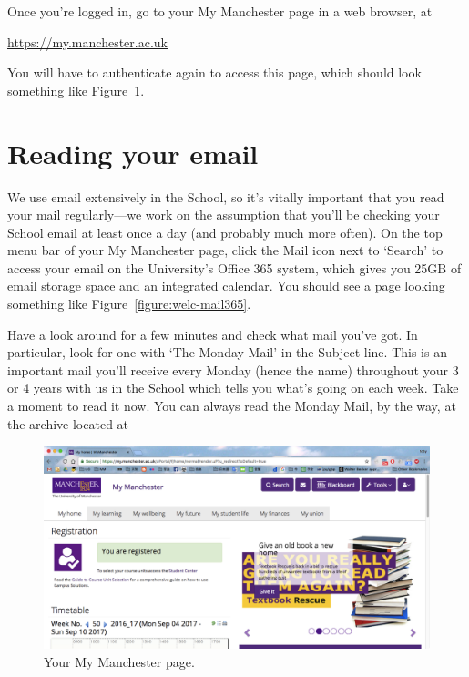 Once you're logged in, go to your My Manchester page in a web browser, at

\url{https://my.manchester.ac.uk}

You will have to authenticate again to access this page, which should look something like Figure~\ref{figure:welc-mymanchester}.


\section{Reading your email}

We use email extensively in the School, so it's vitally important that
you read your mail regularly---we work on the assumption that you'll
be checking your School email at least once a day (and probably much
more often). On the top menu bar of your My Manchester page, click the Mail icon next to `Search'
to access your email on the University's Office 365 system, which gives you 25GB of
email storage space and an integrated calendar. You should see a page
looking something like Figure~\ref{figure:welc-mail365}.

\begin{firstonly}
Have a look around for a few minutes and check what mail you've
got. In particular, look for one with `The Monday Mail' in the
Subject line. This is an important mail you'll receive every Monday
(hence the name) throughout your 3 or 4 years with us in the
School which  tells you what's going on each week. Take a moment to read it now. You can always read the Monday Mail, by the way, at the archive located at\\  
  
\end{firstonly}

\begin{figure}
\centerline{\includegraphics[width=15cm]{images/myManchester-AY17.png}}
\caption{Your My Manchester page.}
\label{figure:welc-mymanchester}
\end{figure}

